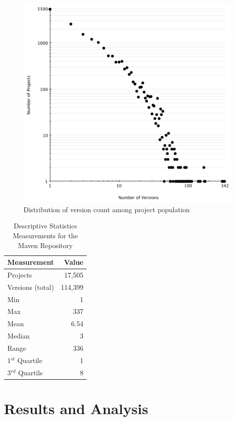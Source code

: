 \documentclass[conference]{IEEEtran}
\begin{document}
\begin{figure}
	\centering
	\includegraphics[scale=0.6]{version_count.pdf}
	\caption{Distribution of version count among project population}
	\label{fig:version-count}
\end{figure}

\begin{table}
\centering
\caption{Descriptive Statistics Measurements for the Maven Repository}
\label{tbl:repository}
\begin{tabular}{l r}
\hline
Measurement & Value\\
 \hline
Projects & 17,505\\
Versions (total) & 114,399\\
Min & 1\\
Max & 337\\
Mean & 6.54\\
Median & 3\\
Range & 336\\
1$^{st}$ Quartile & 1\\
3$^{rd}$ Quartile & 8\\
\hline
\end{tabular}
\end{table}

\section{Results and Analysis}
\label{sec:res}
\end{document}
